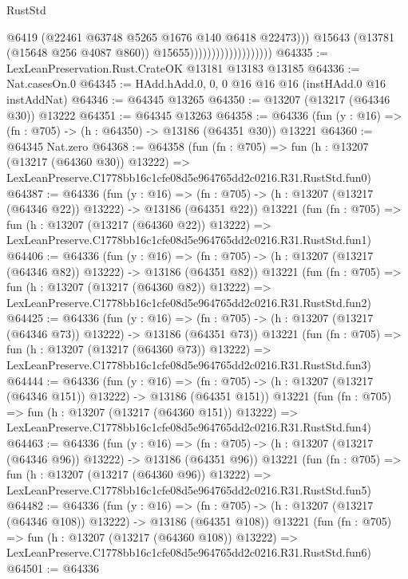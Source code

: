 \begin{lexlean}{RustStd}
\begin{coremodule}
                                              @6419
                                              (@22461 @63748 @5265 @1676 @140 @6418 @22473)))
                                          @15643
                                          (@13781 (@15648 @256 @4087 @860))
                                          @15655)))))))))))))))))))
@64335 := LexLeanPreservation.Rust.CrateOK @13181 @13183 @13185
@64336 := Nat.casesOn.{0}
@64345 := HAdd.hAdd.{0, 0, 0} @16 @16 @16 (instHAdd.{0} @16 instAddNat)
@64346 := @64345 @13265
@64350 := @13207 (@13217 (@64346 @30)) @13222
@64351 := @64345 @13263
@64358 := @64336 (fun (y : @16) => (fn : @705) -> (h : @64350) -> @13186 (@64351 @30)) @13221
@64360 := @64345 Nat.zero
@64368 := @64358
    (fun (fn : @705) =>
    fun (h : @13207 (@13217 (@64360 @30)) @13222) =>
    LexLeanPreserve.C1778bb16c1cfe08d5e964765dd2c0216.R31.RustStd.fun0)
@64387 := @64336
    (fun (y : @16) =>
    (fn : @705) -> (h : @13207 (@13217 (@64346 @22)) @13222) -> @13186 (@64351 @22))
    @13221
    (fun (fn : @705) =>
    fun (h : @13207 (@13217 (@64360 @22)) @13222) =>
    LexLeanPreserve.C1778bb16c1cfe08d5e964765dd2c0216.R31.RustStd.fun1)
@64406 := @64336
    (fun (y : @16) =>
    (fn : @705) -> (h : @13207 (@13217 (@64346 @82)) @13222) -> @13186 (@64351 @82))
    @13221
    (fun (fn : @705) =>
    fun (h : @13207 (@13217 (@64360 @82)) @13222) =>
    LexLeanPreserve.C1778bb16c1cfe08d5e964765dd2c0216.R31.RustStd.fun2)
@64425 := @64336
    (fun (y : @16) =>
    (fn : @705) -> (h : @13207 (@13217 (@64346 @73)) @13222) -> @13186 (@64351 @73))
    @13221
    (fun (fn : @705) =>
    fun (h : @13207 (@13217 (@64360 @73)) @13222) =>
    LexLeanPreserve.C1778bb16c1cfe08d5e964765dd2c0216.R31.RustStd.fun3)
@64444 := @64336
    (fun (y : @16) =>
    (fn : @705) -> (h : @13207 (@13217 (@64346 @151)) @13222) -> @13186 (@64351 @151))
    @13221
    (fun (fn : @705) =>
    fun (h : @13207 (@13217 (@64360 @151)) @13222) =>
    LexLeanPreserve.C1778bb16c1cfe08d5e964765dd2c0216.R31.RustStd.fun4)
@64463 := @64336
    (fun (y : @16) =>
    (fn : @705) -> (h : @13207 (@13217 (@64346 @96)) @13222) -> @13186 (@64351 @96))
    @13221
    (fun (fn : @705) =>
    fun (h : @13207 (@13217 (@64360 @96)) @13222) =>
    LexLeanPreserve.C1778bb16c1cfe08d5e964765dd2c0216.R31.RustStd.fun5)
@64482 := @64336
    (fun (y : @16) =>
    (fn : @705) -> (h : @13207 (@13217 (@64346 @108)) @13222) -> @13186 (@64351 @108))
    @13221
    (fun (fn : @705) =>
    fun (h : @13207 (@13217 (@64360 @108)) @13222) =>
    LexLeanPreserve.C1778bb16c1cfe08d5e964765dd2c0216.R31.RustStd.fun6)
@64501 := @64336

\end{coremodule}
\end{lexlean}
